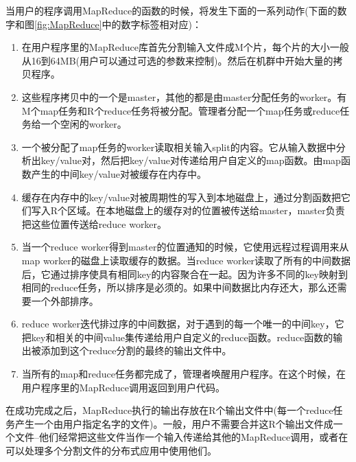 当用户的程序调用MapReduce的函数的时候，将发生下面的一系列动作(下面的数字和图\ref{fig:MapReduce}中的数字标签相对应)：

\begin{enumerate}
\item 在用户程序里的MapReduce库首先分割输入文件成M个片，每个片的大小一般从16到64MB(用户可以通过可选的参数来控制)。然后在机群中开始大量的拷贝程序。

\item 这些程序拷贝中的一个是master，其他的都是由master分配任务的worker。有M个map任务和R个reduce任务将被分配。管理者分配一个map任务或reduce任务给一个空闲的worker。

\item 一个被分配了map任务的worker读取相关输入split的内容。它从输入数据中分析出key/value对，然后把key/value对传递给用户自定义的map函数。由map函数产生的中间key/value对被缓存在内存中。

\item 缓存在内存中的key/value对被周期性的写入到本地磁盘上，通过分割函数把它们写入R个区域。在本地磁盘上的缓存对的位置被传送给master，master负责把这些位置传送给reduce worker。

\item 当一个reduce worker得到master的位置通知的时候，它使用远程过程调用来从map worker的磁盘上读取缓存的数据。当reduce worker读取了所有的中间数据后，它通过排序使具有相同key的内容聚合在一起。因为许多不同的key映射到相同的reduce任务，所以排序是必须的。如果中间数据比内存还大，那么还需要一个外部排序。

\item reduce worker迭代排过序的中间数据，对于遇到的每一个唯一的中间key，它把key和相关的中间value集传递给用户自定义的reduce函数。reduce函数的输出被添加到这个reduce分割的最终的输出文件中。

\item 当所有的map和reduce任务都完成了，管理者唤醒用户程序。在这个时候，在用户程序里的MapReduce调用返回到用户代码。
\end{enumerate}

在成功完成之后，MapReduce执行的输出存放在R个输出文件中(每一个reduce任务产生一个由用户指定名字的文件)。一般，用户不需要合并这R个输出文件成一个文件--他们经常把这些文件当作一个输入传递给其他的MapReduce调用，或者在可以处理多个分割文件的分布式应用中使用他们。

